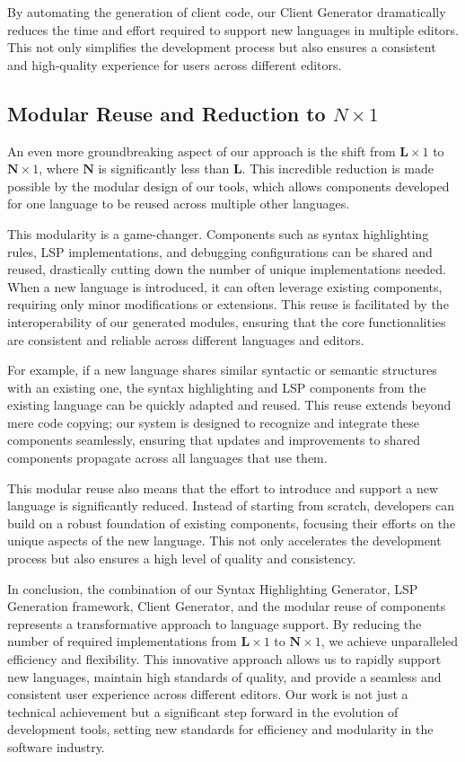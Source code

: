 By automating the generation of client code, our Client Generator dramatically reduces the time and effort required to support new languages in multiple editors. This not only simplifies the development process but also ensures a consistent and high-quality experience for users across different editors.

\subsection{Modular Reuse and Reduction to $N \times 1$} \label{subsec:concept:ModularReuseAndReductionToNtimes1}

An even more groundbreaking aspect of our approach is the shift from $\mathbf{L} \times 1$ to $\mathbf{N} \times 1$, where $\mathbf{N}$ is significantly less than $\mathbf{L}$. This incredible reduction is made possible by the modular design of our tools, which allows components developed for one language to be reused across multiple other languages.

This modularity is a game-changer. Components such as syntax highlighting rules, LSP implementations, and debugging configurations can be shared and reused, drastically cutting down the number of unique implementations needed. When a new language is introduced, it can often leverage existing components, requiring only minor modifications or extensions. This reuse is facilitated by the interoperability of our generated modules, ensuring that the core functionalities are consistent and reliable across different languages and editors.

For example, if a new language shares similar syntactic or semantic structures with an existing one, the syntax highlighting and LSP components from the existing language can be quickly adapted and reused. This reuse extends beyond mere code copying; our system is designed to recognize and integrate these components seamlessly, ensuring that updates and improvements to shared components propagate across all languages that use them.

This modular reuse also means that the effort to introduce and support a new language is significantly reduced. Instead of starting from scratch, developers can build on a robust foundation of existing components, focusing their efforts on the unique aspects of the new language. This not only accelerates the development process but also ensures a high level of quality and consistency.

In conclusion, the combination of our Syntax Highlighting Generator, LSP Generation framework, Client Generator, and the modular reuse of components represents a transformative approach to language support. By reducing the number of required implementations from $\mathbf{L} \times 1$ to $\mathbf{N} \times 1$, we achieve unparalleled efficiency and flexibility. This innovative approach allows us to rapidly support new languages, maintain high standards of quality, and provide a seamless and consistent user experience across different editors. Our work is not just a technical achievement but a significant step forward in the evolution of development tools, setting new standards for efficiency and modularity in the software industry.


